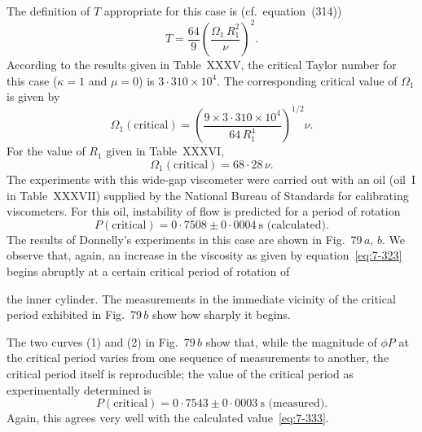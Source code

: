The definition of $T$ appropriate for this case is (cf.\ equation~(314))
\begin{equation}\label{eq:7-330}
T = \frac{64}{9}\!\left(\frac{\Omega_1\,R_1^2}{\nu}\right)^{\!2}.
\end{equation}
According to the results given in Table~XXXV, the critical Taylor
number for this case ($\kappa = 1$ and $\mu = 0$) is $3{\cdot}310 \times 10^4$.  The corresponding
critical value of $\Omega_1$ is given by
\begin{equation}\label{eq:7-331}
\Omega_1(\text{critical}) = \left(\frac{9 \times 3{\cdot}310 \times 10^4}{64\,R_1^4}\right)^{1/2}\!\nu.
\end{equation}
For the value of $R_1$ given in Table~XXXVI,
\begin{equation}\label{eq:7-332}
\Omega_1(\text{critical}) = 68{\cdot}28\,\nu.
\end{equation}
The experiments with this wide-gap viscometer were carried out with
an oil (oil~I in Table~XXXVII) supplied by the National Bureau of
Standards for calibrating viscometers.  For this oil, instability of flow
is predicted for a period of rotation
\begin{equation}\label{eq:7-333}
P(\text{critical}) = 0{\cdot}7508 \pm 0{\cdot}0004~\text{s (calculated)}.
\end{equation}
The results of Donnelly's experiments in this case are shown in Fig.~79\,$a$, $b$.  We observe that, again, an increase in the viscosity as given by
equation~\eqref{eq:7-323} begins abruptly at a certain critical period of rotation of



\noindent the inner cylinder.  The measurements in the immediate vicinity of the
critical period exhibited in Fig.~79\,$b$ show how sharply it begins.

The two curves (1) and (2) in Fig.~79\,$b$ show that, while the magnitude
of $\phi P$ at the critical period varies from one sequence of measurements to
another, the critical period itself is reproducible; the value of the critical
period as experimentally determined is
\begin{equation}\label{eq:7-334}
P(\text{critical}) = 0{\cdot}7543 \pm 0{\cdot}0003~\text{s (measured)}.
\end{equation}
Again, this agrees very well with the calculated value~\eqref{eq:7-333}.

